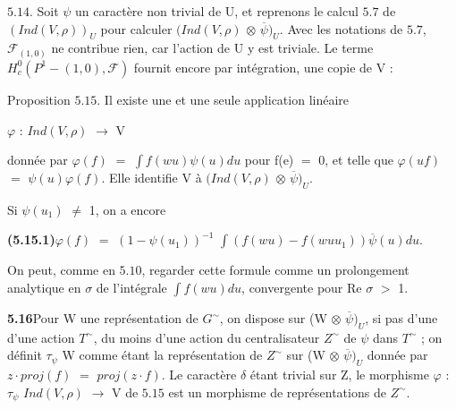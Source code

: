 \documentclass[10pt,a4paper]{article}
\begin{document}
\clearpage
{}
\label{d035-physical-026}
\par $5.14$. Soit $\psi{}$ un caractère non trivial de U, et reprenons le calcul $5.7$ de $(Ind(V,\rho{}))_U$ pour calculer $(Ind(V,\rho{})$ $\otimes{}$ $\overline{\psi{}})_U$. Avec les notations de $5.7$, $\mathcal{F}_{(1,0)}$ ne contribue rien, car l'action de U y est triviale. Le terme $H_c^0(P^1-{(1,0)},\mathcal{F})$ fournit encore par intégration, une copie de V :\par
\par Proposition $5.15$. Il existe une et une seule application linéaire\par
\par\smallskip\begin{center}\begin{minipage}{0.96\textwidth}\centering
$\varphi{}$ : $Ind(V,\rho{})$ $\to{}$ V
\end{minipage}\end{center}\smallskip
\par donnée par $\varphi{}(f)$ $=$ $\int{}f(wu)\psi{}(u)du$ pour f(e) $=$ 0, et telle que $\varphi{}(uf)$ $=$ $\psi{}(u)\varphi{}(f)$. Elle identifie V à $(Ind(V,\rho{})$ $\otimes{}$ $\overline{\psi{}})_U$.\par
\par Si $\psi{}(u_1)$ $\ne{}$ 1, on a encore\par
\par\noindent\textbf{(5.15.1)}\quad $\varphi{}(f)$ $=$ $(1-\psi{}(u_1))^{-1}$ $\int{}(f(wu)-f(wuu_1))\overline{\psi{}}(u)du$.\par
\par On peut, comme en $5.10$, regarder cette formule comme un prolongement analytique en $\sigma{}$ de l'intégrale $\int{}f(wu)du$, convergente pour Re $\sigma{}$ $>$ 1.\par
\par\noindent\textbf{5.16}\quad Pour W une représentation de $G^\sim$, on dispose sur (W $\otimes{}$ $\overline{\psi{}})_U$, si pas d'une d'une action $T^\sim$, du moins d'une action du centralisateur $Z^\sim$ de $\psi{}$ dans $T^\sim$ ; on définit $\tau{}_\psi{}$ W comme étant la représentation de $Z^\sim$ sur (W $\otimes{}$ $\overline{\psi{}})_U$ donnée par $z\cdot{}proj(f)$ $=$ $proj(z\cdot{}f)$. Le caractère $\delta{}$ étant trivial sur Z, le morphisme $\varphi{}$ : $\tau{}_\psi{}$ $Ind(V,\rho{})$ $\to{}$ V de $5.15$ est un morphisme de représentations de $Z^\sim$.\par
\end{document}
